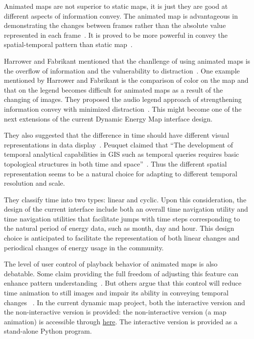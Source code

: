 Animated maps are not superior to static maps, it is just they are
good at different aspects of information convey. The animated map is
advantageous in demonstrating the changes between frames rather than
the absolute value represented in each frame~\cite{Dorling1992}. It is
proved to be more powerful in convey the spatial-temporal pattern than
static map~\cite{McEachern1998}.

Harrower and Fabrikant mentioned that the chanllenge of using animated
maps is the overflow of information and the vulnerability to
distraction~\cite{Harrower2008}. One example mentioned by Harrower and
Fabrikant is the comparison of color on the map and that on the legend
becomes difficult for animated maps as a result of the changing of
images. They proposed the audio legend approach of strengthening
information convey with minimized
distraction~\cite{Harrower2008}. This might become one of the next
extensions of the current Dynamic Energy Map interface design.

They also suggested that the difference in time should have different
visual representations in data display~\cite{Harrower2008}. Peuquet
claimed that ``The development of temporal analytical capabilities in
GIS such as temporal queries requires basic topological structures in
both time and space''~\cite{Peuquet1994}. Thus the different spatial
representation seems to be a natural choice for adapting to different
temporal resolution and scale.

They classify time into two types: linear and cyclic. Upon this
consideration, the design of the current interface include both an
overall time navigation utility and time navigation utilities that
facilitate jumps with time steps corresponding to the natural period
of energy data, such as month, day and hour. This design choice
is anticipated to facilitate the representation of both linear changes
and periodical changes of energy usage in the community.

The level of user control of playback behavior of animated maps is
also debatable. Some claim providing the full freedom of adjusting
this feature can enhance pattern understanding~\cite{Nelson1998}. But
others argue that this control will reduce time animation to still
images and impair its ability in conveying temporal changes
~\cite{Lowe2004}. In the current dynamic map project, both the
interactive version and the non-interactive version is provided: the
non-interactive version (a map animation) is accessible through
\href{http://www.armechxyj.com/energy-mapping.html#redblueAnime3d}{here}. The
interactive version is provided as a stand-alone Python program.

